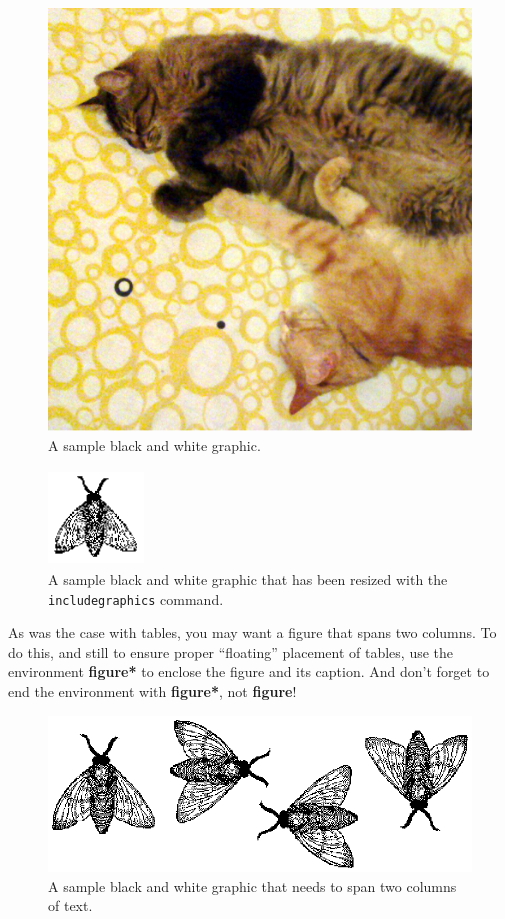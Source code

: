 \begin{figure}
\includegraphics{Figs/cats}
\caption{A sample black and white graphic.}
\end{figure}

\begin{figure}
\includegraphics[height=1in, width=1in]{Figs/fly}
\caption{A sample black and white graphic
that has been resized with the \texttt{includegraphics} command.}
\end{figure}


As was the case with tables, you may want a figure that spans two
columns.  To do this, and still to ensure proper ``floating''
placement of tables, use the environment \textbf{figure*} to enclose
the figure and its caption.  And don't forget to end the environment
with \textbf{figure*}, not \textbf{figure}!

\begin{figure}
\includegraphics{Figs/flies}
\caption{A sample black and white graphic
that needs to span two columns of text.}
\end{figure}


